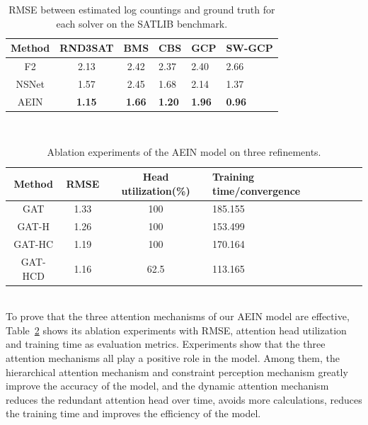 \begin{table}[htbp] 
  \centering  
  \caption{RMSE between estimated log countings and ground truth for each solver on the SATLIB benchmark.}  
  \begin{tabular}{ccclll}  
    \toprule
    Method& RND3SAT& BMS & CBS& GCP&SW-GCP\\  
    \midrule
    F2& 2.13& 2.42& 2.37& 2.40&2.66\\  
    NSNet& 1.57& 2.45& 1.68& 2.14&1.37\\  
    AEIN& \textbf{1.15}& \textbf{1.66}& \textbf{1.20}& \textbf{1.96}&\textbf{0.96}\\  
    \bottomrule
  \end{tabular}
  \label{tab1}  
\end{table}\\
\begin{table}[htbp] 
  \centering  
  \caption{Ablation experiments of the AEIN model on three refinements.}  
  \begin{tabular}{ccclll}  
    \toprule
    Method& RMSE& Head utilization(\%)& Training time/convergence\\ 
    \midrule
    GAT& 1.33& 100& 185.155\\  
    GAT-H& 1.26& 100& 153.499\\  
    GAT-HC& 1.19& 100& 170.164\\
    \centering  
    GAT-HCD& 1.16& 62.5& 113.165\\  
    \bottomrule
  \end{tabular}
  \label{tab2}  
\end{table}\\
To prove that the three attention mechanisms of our AEIN model are effective, Table~\ref{tab2} shows its ablation experiments 
with RMSE, attention head utilization and training time as evaluation metrics. Experiments show that the three attention mechanisms 
all play a positive role in the model. Among them, the hierarchical attention mechanism and constraint perception mechanism greatly 
improve the accuracy of the model, and the dynamic attention mechanism reduces the redundant attention head over time, avoids more 
calculations, reduces the training time and improves the efficiency of the model.
